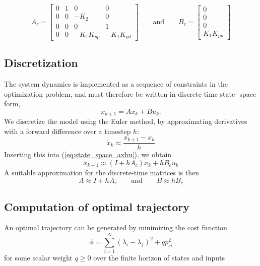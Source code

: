 \begin{equation}
    A_c = \begin{bmatrix} 0 & 1 & 0 & 0 \\ 0 & 0 & -K_2 & 0 \\ 0 & 0 & 0 & 1 \\ 0 & 0 & -K_1K_{pp} & -K_1K_{pd} \end{bmatrix}
    \qquad\text{and}\qquad
    B_c = \begin{bmatrix}0 \\ 0 \\ 0 \\K_1K_{pp} \end{bmatrix}
\end{equation}

\subsection{Discretization}

The system dynamics is implemented as a sequence of constraints in the
optimization problem, and must therefore be written in discrete-time state-
space form,
\begin{equation}
    x_{k+1} = Ax_k + Bu_k.
    \label{eq:discrete_state_space_axbu}
\end{equation}
We discretize the model using the Euler method, by approximating derivatives
with a forward difference over a timestep $h$:
\begin{equation}
    \dot{x}_k \approx \frac{x_{k+1} - x_k}{h}
\end{equation}
Inserting this into (\ref{eq:state_space_axbu}), we obtain
\begin{equation}
    x_{k+1} \approx (I + hA_c) x_k + hB_c u_k
\end{equation}
A suitable approximation for the discrete-time matrices is then
\begin{equation}
    A \approx I + hA_c
    \qquad\text{and}\qquad
    B \approx hB_c
\end{equation}

\subsection{Computation of optimal trajectory}

An optimal trajectory can be generated by minimizing the cost function
\begin{equation}
    \label{eq:trajectory_cost}
    \phi = \sum_{i=1}^{N}(\lambda_i - \lambda_f)^2 + qp_{ci}^2
\end{equation}
for some scalar weight $q \geq 0$ over the finite horizon of states and inputs

